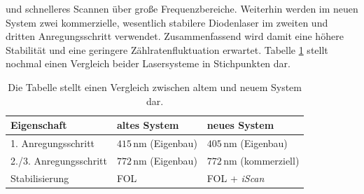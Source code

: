 und schnelleres Scannen über große Frequenzbereiche. Weiterhin werden im neuen
System zwei kommerzielle, wesentlich stabilere Diodenlaser im zweiten und
dritten Anregungsschritt verwendet. Zusammenfassend wird damit eine höhere
Stabilität und eine geringere Zählratenfluktuation erwartet. Tabelle
\ref{tab:vergleich_alt_neu} stellt nochmal einen Vergleich beider Lasersysteme
in Stichpunkten dar.
\begin{table}
	\begin{tabular}{p{}|p{}p{}}
		\toprule
		Eigenschaft & altes System & neues System\\
		\midrule[1px]
		\hline
		1. Anregungsschritt & $415\,$nm (Eigenbau) & $405\,$nm (Eigenbau)\\
		2./3. Anregungsschritt & $772\,$nm (Eigenbau) & $772\,$nm (kommerziell)\\
		Stabilisierung & FOL & FOL +
		\textit{iScan}\\
		\bottomrule[1px]
	\end{tabular}
	\caption[Vergleich von altem und
	neuem Lasersystem]{Die Tabelle stellt einen Vergleich zwischen altem und neuem
	System dar.}
	\label{tab:vergleich_alt_neu}
\end{table}

